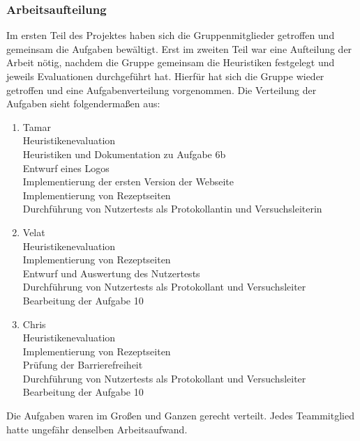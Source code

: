 \documentclass[parskip,10pt,abstracton]{scrartcl}
\begin{document}
\subsubsection*{Arbeitsaufteilung}
Im ersten Teil des Projektes haben sich die Gruppenmitglieder getroffen und gemeinsam die Aufgaben bewältigt. Erst im zweiten Teil war eine Aufteilung der Arbeit nötig, nachdem die Gruppe gemeinsam die Heuristiken festgelegt und jeweils Evaluationen durchgeführt hat. Hierfür hat sich die Gruppe wieder getroffen und eine Aufgabenverteilung vorgenommen. Die Verteilung der Aufgaben sieht folgendermaßen aus:
\begin{enumerate}[o]
 \item Tamar\\
 Heuristikenevaluation\\
 Heuristiken und Dokumentation zu Aufgabe 6b\\
 Entwurf eines Logos\\
 Implementierung der ersten Version der Webseite\\
 Implementierung von Rezeptseiten\\
 Durchführung von Nutzertests als Protokollantin und Versuchsleiterin
 \item Velat\\
 Heuristikenevaluation\\
 Implementierung von Rezeptseiten\\
 Entwurf und Auswertung des Nutzertests\\
 Durchführung von Nutzertests als Protokollant und Versuchsleiter\\
 Bearbeitung der Aufgabe 10\\
 \item Chris\\
 Heuristikenevaluation\\
 Implementierung von Rezeptseiten\\
 Prüfung der Barrierefreiheit\\ 
 Durchführung von Nutzertests als Protokollant und Versuchsleiter\\
 Bearbeitung der Aufgabe 10\\
\end{enumerate}
 Die Aufgaben waren im Großen und Ganzen gerecht verteilt. Jedes Teammitglied hatte ungefähr denselben Arbeitsaufwand.
\end{document}
